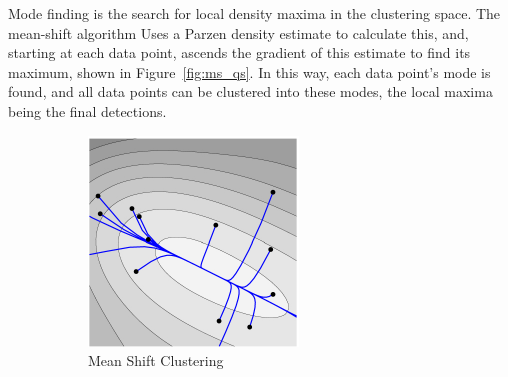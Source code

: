 Mode finding is the search for local density maxima in the clustering space. The mean-shift algorithm \cite{cheng1995mean} Uses a Parzen density estimate to calculate this, and, starting at each data point, ascends the gradient of this estimate to find its maximum, shown in Figure~\ref{fig:ms_qs}. In this way, each data point's mode is found, and all data points can be clustered into these modes, the local maxima being the final detections.

\begin{figure}[hbt]
    \centering
    \begin{subfigure}[b]{0.45\textwidth}
            \centering
            \includegraphics[width=\textwidth]{MeanShift}
            \caption{Mean Shift Clustering}
            \label{fig:ms}
    \end{subfigure}
    ~ %
    \begin{subfigure}[b]{0.45\textwidth}
            \centering

\end{subfigure}
\end{figure}
